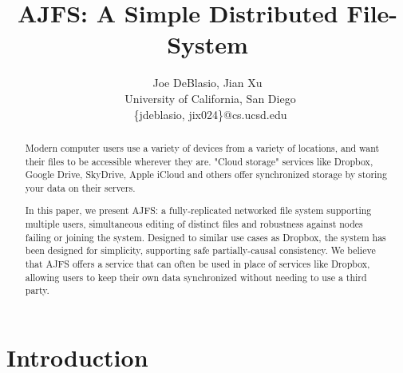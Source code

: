 \documentclass[preprint]{sig-alternate-10pt}
\begin{document}



\title{AJFS: A Simple Distributed File-System}

\author{Joe DeBlasio, Jian Xu\\\
       University of California, San Diego \\\
       \{jdeblasio, jix024\}@cs.ucsd.edu}

\maketitle

\begin{abstract}
    Modern computer users use a variety of devices from a variety of locations,
and want their files to be accessible wherever they are. "Cloud storage"
services like Dropbox, Google Drive, SkyDrive, Apple iCloud and others offer
synchronized storage by storing your data on their servers.

    In this paper, we present AJFS: a fully-replicated networked file system
supporting multiple users, simultaneous editing of distinct files and robustness
against nodes failing or joining the system. Designed to similar use cases as
Dropbox, the system has been designed for simplicity, supporting safe
partially-causal consistency. We believe that AJFS offers a service that can
often be used in place of services like Dropbox, allowing users to keep their
own data synchronized without needing to use a third party.
\end{abstract}

\section{Introduction}
\label{sec:introduction}

\end{document}
